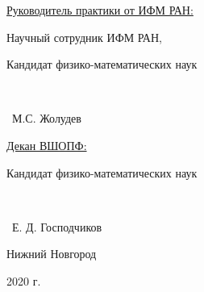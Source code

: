\documentclass[../main.tex]{subfiles}
\begin{document}
\begin{titlepage}
\begin{flushright}
    \vspace{0.3 cm}
     \underline{Руководитель практики от ИФМ РАН:}
    
    Научный сотрудник ИФМ РАН,

    Кандидат физико-математических наук
    
    \begin{minipage}[t][0.1cm][t]{2in} %
    
      \underline{\hspace{2in}}\\ %
      \centering
      \vspace{0.1 cm} %
    \end{minipage}~М.С. Жолудев
    
    \vspace{0.3 cm}
    
    \underline{Декан ВШОПФ:}
    
    Кандидат физико-математических наук
    
    \begin{minipage}[t][0.1 cm][t]{2in} %
      \underline{\hspace{2in}}\\ %
      \centering
      \vspace{0.1 cm} %
    \end{minipage}~Е. Д. Господчиков
    
    \end{flushright}
    
    \vspace{0.1cm}
    
    \begin{center}
        Нижний Новгород
    
        2020 г.
    \end{center}
    
    \end{titlepage}
\end{document}
